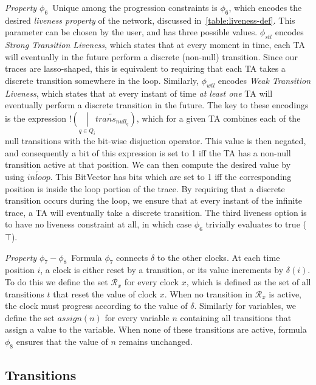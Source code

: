 \documentclass[a4paper,11pt]{report}
\newcommand*\BitOr{\mathbin{|}}
\newcommand{\BitNeg}{!}
\theoremstyle{definition}
\begin{document}
\emph{Property $\phi_6$}\ Unique among the progression constraints is $\phi_{6}$,
which encodes the desired \emph{liveness property} of the network, discussed
in~\ref{table:liveness-def}. This parameter can be chosen by the user, and has
three possible values. $\phi_{stl}$ encodes \emph{Strong Transition Liveness},
which states that at every moment in time, each TA will eventually in the future
perform a discrete (non-null) transition. Since our traces are lasso-shaped,
this is equivalent to requiring that each TA takes a discrete transition
somewhere in the loop. Similarly, $\phi_{wtl}$ encodes \emph{Weak Transition
  Liveness}, which states that at every instant of time \emph{at least one} TA
will eventually perform a discrete transition in the future. The key to these
encodings is the expression
\(\BitNeg (\underset{q \in Q_{i}}{\BitOr} \overleftarrow{trans_{null_{q}}})\),
which for a given TA combines each of the null transitions with the bit-wise
disjuction operator. This value is then negated, and consequently a bit of this
expression is set to 1 iff the TA has a non-null transition active at that
position. We can then compute the desired value by using
\(\overleftarrow{inloop}\). This BitVector has bits which are set to 1 iff the
corresponding position is inside the loop portion of the trace. By requiring
that a discrete transition occurs during the loop, we ensure that at every
instant of the infinite trace, a TA will eventually take a discrete transition.
The third liveness option is to have no liveness constraint at all, in which
case $\phi_{6}$ trivially evaluates to true ($\top$).

\emph{Property $\phi_7 - \phi_{8}$}\ Formula \(\phi_7\) connects \(\delta\) to
the other clocks. At each time position \(i\), a clock is either reset by a
transition, or its value increments by \(\delta(i)\). To do this we define the
set \(\mathcal{R}_x\) for every clock \(x\), which is defined as the set of all
transitions \(t\) that reset the value of clock \(x\). When no transition in
\(\mathcal{R}_x\) is active, the clock must progress according to the value of
\(\delta\). Similarly for variables, we define the set \(assign(n)\) for every
variable \(n\) containing all transitions that assign a value to the variable.
When none of these transitions are active, formula \(\phi_8\) ensures that the
value of \(n\) remains unchanged.

\subsection{Transitions}
\end{document}
